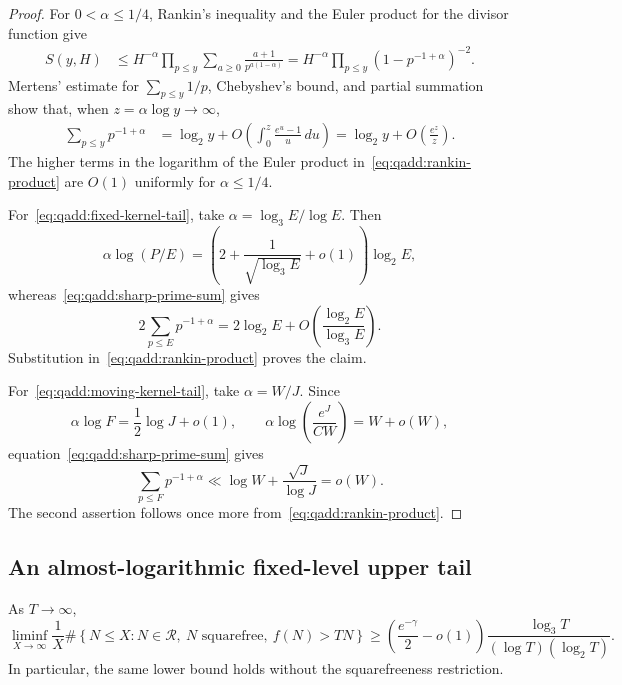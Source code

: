 \begin{proof}
For $0<\alpha\leq1/4$, Rankin's inequality and the Euler product
for the divisor function give
\begin{align}
 S(y,H)
 &\leq H^{-\alpha}
       \prod_{p\leq y}\sum_{a\geq0}
                \frac{a+1}{p^{a(1-\alpha)}}
  =H^{-\alpha}
       \prod_{p\leq y}(1-p^{-1+\alpha})^{-2}.
 \label{eq:qadd:rankin-product}
\end{align}
Mertens' estimate for $\sum_{p\leq y}1/p$, Chebyshev's bound,
and partial summation show that, when
$z=\alpha\log y\to\infty$,
\begin{align}
 \sum_{p\leq y}p^{-1+\alpha}
 &=\log_2y+
   O\left(\int_0^z\frac{e^u-1}{u}\,du\right)
  =\log_2y+O\left(\frac{e^z}{z}\right).
 \label{eq:qadd:sharp-prime-sum}
\end{align}
The higher terms in the logarithm of the Euler product
in~\eqref{eq:qadd:rankin-product} are $O(1)$ uniformly for
$\alpha\leq1/4$.

For~\eqref{eq:qadd:fixed-kernel-tail}, take
$\alpha=\log_3E/\log E$. Then
\[
 \alpha\log(P/E)
 =\left(2+\frac1{\sqrt{\log_3E}}+o(1)\right)\log_2E,
\]
whereas~\eqref{eq:qadd:sharp-prime-sum} gives
\[
 2\sum_{p\leq E}p^{-1+\alpha}
 =2\log_2E+
   O\left(\frac{\log_2E}{\log_3E}\right).
\]
Substitution in~\eqref{eq:qadd:rankin-product} proves the claim.

For~\eqref{eq:qadd:moving-kernel-tail}, take $\alpha=W/J$.
Since
\[
 \alpha\log F=\frac12\log J+o(1),
 \qquad
 \alpha\log\left(\frac{e^J}{CW}\right)=W+o(W),
\]
equation~\eqref{eq:qadd:sharp-prime-sum} gives
\[
 \sum_{p\leq F}p^{-1+\alpha}
 \ll\log W+\frac{\sqrt J}{\log J}=o(W).
\]
The second assertion follows once more
from~\eqref{eq:qadd:rankin-product}.
\end{proof}

\subsection{An almost-logarithmic fixed-level upper tail}

\begin{theorem}
\label{thm:qadd:almost-log-tail}
As $T\to\infty$,
\begin{equation}
\label{eq:qadd:almost-log-tail}
 \liminf_{X\to\infty}\frac1X
 \#\left\{N\leq X:
       N\in\mathcal R,\ N\text{ squarefree},\ f(N)>TN
       \right\}
 \geq\left(\frac{e^{-\gamma}}2-o(1)\right)
       \frac{\log_3T}{(\log T)(\log_2T)}.
\end{equation}
In particular, the same lower bound holds without the
squarefreeness restriction.
\end{theorem}

